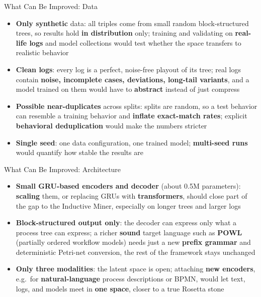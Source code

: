 \documentclass[aspectratio=169]{beamer}
\newcommand{\keyc}[1]{\textbf{\textcolor{procblue}{#1}}}
\newcommand{\keyg}[1]{\textbf{\textcolor{procgreen!70!black}{#1}}}
\newcommand{\keya}[1]{\textbf{\textcolor{procamber!85!black}{#1}}}
\begin{document}
\begin{frame}{What Can Be Improved: Data}
  \begin{itemize}\setlength{\itemsep}{10pt}
    \item \keya{Only synthetic} data: all triples come from small random
      block-structured trees, so results hold \keyc{in distribution} only;
      training and validating on \keyc{real-life logs} and model collections
      would test whether the space transfers to realistic behavior
    \item \keya{Clean logs}: every log is a perfect, noise-free playout of its
      tree; real logs contain \keyc{noise, incomplete cases, deviations,
      long-tail variants}, and a model trained on them would have to
      \keyc{abstract} instead of just compress
    \item \keya{Possible near-duplicates} across splits: splits are random, so
      a test behavior can resemble a training behavior and
      \keyc{inflate exact-match rates}; explicit \keyc{behavioral deduplication}
      would make the numbers stricter
    \item \keya{Single seed}: one data configuration, one trained model;
      \keyc{multi-seed runs} would quantify how stable the results are
  \end{itemize}
\end{frame}

\begin{frame}{What Can Be Improved: Architecture}
  \begin{itemize}\setlength{\itemsep}{12pt}
    \item \keya{Small GRU-based encoders and decoder} (about 0.5M parameters):
      \keyc{scaling} them, or replacing GRUs with \keyc{transformers},
      should close part of the gap to the Inductive Miner,
      especially on longer trees and larger logs
    \item \keya{Block-structured output only}: the decoder can express only what
      a process tree can express; a richer \keyg{sound} target language such as
      \keyc{POWL} (partially ordered workflow models) needs just a new
      \keyc{prefix grammar} and deterministic Petri-net conversion,
      the rest of the framework stays unchanged
    \item \keya{Only three modalities}: the latent space is open;
      attaching \keyc{new encoders}, e.g.\ for \keyg{natural-language}
      process descriptions or BPMN, would let text, logs, and models
      meet in \keyc{one space}, closer to a true Rosetta stone
  \end{itemize}
\end{frame}
\end{document}
